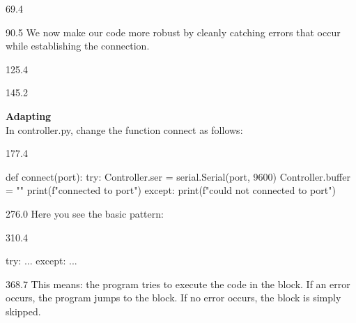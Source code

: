 \documentclass{aslab}
\begin{document}
\nextpage
\begin{region}{69.4}
\end{region}

\begin{region}[pitch=13.1]{90.5}
We now make our code more robust by cleanly catching errors that occur while
establishing the connection.
\end{region}

\begin{region}{125.4}
\end{region}

\begin{region}[pitch=13.3]{145.2}
\begin{tasks}
\item \textbf{Adapting} \\
  In controller.py, change the function connect as follows:
\end{tasks}
\end{region}

\begin{region}[x=74.7,right=0,pitch=13.2]{177.4}
\begin{codeblock}
def connect(port):
    try:
        Controller.ser = serial.Serial(port, 9600)
        Controller.buffer = ""
        print(f"connected to {port}")
    except:
        print(f"could not connected to {port}")
\end{codeblock}
\end{region}

\begin{region}[x=74.7,right=0,pitch=15.5]{276.0}
Here you see the basic pattern:
\end{region}

\begin{region}[x=74.7,right=0,pitch=13.2]{310.4}
\begin{codeblock}
try:
    ...
except:
    ...
\end{codeblock}
\end{region}

\begin{region}[x=74.7,right=0,pitch=13.5]{368.7}
This means: the program tries to execute the code in the  block.
If an error occurs, the program jumps to the  block. If no
error occurs, the  block is simply skipped.
\end{region}
\end{document}
